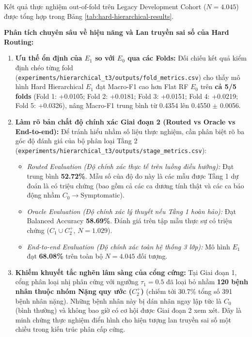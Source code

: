 Kết quả thực nghiệm out-of-fold trên Legacy Development Cohort ($N = 4.045$) được tổng hợp trong Bảng \ref{tab:hard-hierarchical-results}.



\textbf{Phân tích chuyên sâu về hiệu năng và Lan truyền sai số của Hard Routing:}
\begin{enumerate}
    \item \textbf{Ưu thế ổn định của $E_1$ so với $E_0$ qua các Folds:} Đối chiếu kết quả kiểm định chéo từng fold (\texttt{experiments/hierarchical\_t3/outputs/fold\_metrics.csv}) cho thấy mô hình Hard Hierarchical $E_1$ đạt Macro-F1 cao hơn Flat RF $E_0$ trên \textbf{cả 5/5 folds} (Fold 1: +0.0105; Fold 2: +0.0181; Fold 3: +0.0151; Fold 4: +0.0219; Fold 5: +0.0326), nâng Macro-F1 trung bình từ 0.4354 lên 0.4550 $\pm$ 0.0056.
    \item \textbf{Làm rõ bản chất độ chính xác Giai đoạn 2 (Routed vs Oracle vs End-to-end):} Để tránh hiểu nhầm số liệu thực nghiệm, cần phân biệt rõ ba góc độ đánh giá của bộ phân loại Tầng 2 (\texttt{experiments/hierarchical\_t3/outputs/stage\_metrics.csv}):
    \begin{itemize}
        \item \textit{Routed Evaluation (Độ chính xác thực tế trên luồng điều hướng):} Đạt trung bình \textbf{52.72\%}. Mẫu số của độ đo này là các mẫu được Tầng 1 dự đoán là có triệu chứng (bao gồm cả các ca dương tính thật và các ca báo động nhầm $C_0 \to \text{Symptomatic}$).
        \item \textit{Oracle Evaluation (Độ chính xác lý thuyết nếu Tầng 1 hoàn hảo):} Đạt Balanced Accuracy \textbf{58.69\%}. Đánh giá trên tập mẫu thực sự có triệu chứng ($C_1 \cup C_2^+$, $N = 1.029$).
        \item \textit{End-to-end Evaluation (Độ chính xác toàn hệ thống 3 lớp):} Mô hình $E_1$ đạt \textbf{68.08\%} trên toàn bộ $N = 4.045$ đối tượng.
    \end{itemize}
    \item \textbf{Khiếm khuyết tắc nghẽn lâm sàng của cổng cứng:} Tại Giai đoạn 1, cổng phân loại nhị phân cứng với ngưỡng $\tau_1 = 0.5$ đã loại bỏ nhầm \textbf{120 bệnh nhân thuộc nhóm Nặng quy ước ($C_2^+$)} (chiếm tới 30.7\% tổng số 391 bệnh nhân nặng). Những bệnh nhân này bị dán nhãn ngay lập tức là $C_0$ (bình thường) và không bao giờ có cơ hội được Giai đoạn 2 xem xét. Đây là minh chứng thực nghiệm điển hình cho hiện tượng lan truyền sai số một chiều trong kiến trúc phân cấp cứng.
\end{enumerate}

